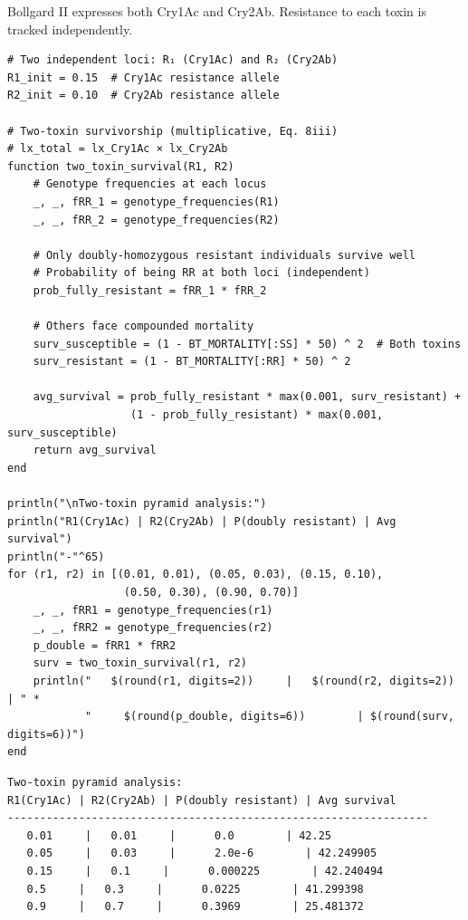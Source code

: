 \label{2678493009396511976}{}


Bollgard II expresses both Cry1Ac and Cry2Ab. Resistance to each toxin is tracked independently.




\begin{verbatim}
# Two independent loci: R₁ (Cry1Ac) and R₂ (Cry2Ab)
R1_init = 0.15  # Cry1Ac resistance allele
R2_init = 0.10  # Cry2Ab resistance allele

# Two-toxin survivorship (multiplicative, Eq. 8iii)
# lx_total = lx_Cry1Ac × lx_Cry2Ab
function two_toxin_survival(R1, R2)
    # Genotype frequencies at each locus
    _, _, fRR_1 = genotype_frequencies(R1)
    _, _, fRR_2 = genotype_frequencies(R2)

    # Only doubly-homozygous resistant individuals survive well
    # Probability of being RR at both loci (independent)
    prob_fully_resistant = fRR_1 * fRR_2

    # Others face compounded mortality
    surv_susceptible = (1 - BT_MORTALITY[:SS] * 50) ^ 2  # Both toxins
    surv_resistant = (1 - BT_MORTALITY[:RR] * 50) ^ 2

    avg_survival = prob_fully_resistant * max(0.001, surv_resistant) +
                   (1 - prob_fully_resistant) * max(0.001, surv_susceptible)
    return avg_survival
end

println("\nTwo-toxin pyramid analysis:")
println("R1(Cry1Ac) | R2(Cry2Ab) | P(doubly resistant) | Avg survival")
println("-"^65)
for (r1, r2) in [(0.01, 0.01), (0.05, 0.03), (0.15, 0.10),
                  (0.50, 0.30), (0.90, 0.70)]
    _, _, fRR1 = genotype_frequencies(r1)
    _, _, fRR2 = genotype_frequencies(r2)
    p_double = fRR1 * fRR2
    surv = two_toxin_survival(r1, r2)
    println("   $(round(r1, digits=2))     |   $(round(r2, digits=2))     | " *
            "     $(round(p_double, digits=6))        | $(round(surv, digits=6))")
end
\end{verbatim}




\begin{verbatim}
Two-toxin pyramid analysis:
R1(Cry1Ac) | R2(Cry2Ab) | P(doubly resistant) | Avg survival
-----------------------------------------------------------------
   0.01     |   0.01     |      0.0        | 42.25
   0.05     |   0.03     |      2.0e-6        | 42.249905
   0.15     |   0.1     |      0.000225        | 42.240494
   0.5     |   0.3     |      0.0225        | 41.299398
   0.9     |   0.7     |      0.3969        | 25.481372
\end{verbatim}



